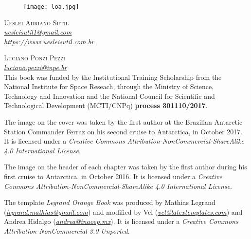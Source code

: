 \newpage
\thispagestyle{empty}

\begin{figure}[H]
    \centering
    \vspace*{\fill}
    \texttt{[image: loa.jpg]}
    \vspace{0.5cm}
\end{figure}

\noindent \textsc{Ueslei Adriano Sutil} 
\\
\noindent \textcolor{bleu_cite}{\href{mailto:uesleisutil1@gmail.com}{\textit{uesleisutil1@gmail.com}}}
\\  %
\noindent \textcolor{bleu_cite}{\href{https://www.uesleisutil.com.br}{\textit{https://www.uesleisutil.com.br}}}
\bigskip

\noindent \textsc{Luciano Ponzi Pezzi}
\\
\noindent \textcolor{bleu_cite}{\href{mailto:luciano.pezzi@inpe.br}{\textit{luciano.pezzi@inpe.br}}}  %
\bigskip
\\

\noindent This book was funded by the Institutional Training Scholarship from the National Institute for Space Reseach, through the Ministry of Science, Technology and Innovation and the National 
Council for Scientific and Technological Development (MCTI/CNPq) \textbf{process 301110/2017}.
\bigskip

\noindent The image on the cover was taken by the first author at the Brazilian Antarctic Station Commander Ferraz on his second cruise to Antarctica,
          in October 2017. It is licensed under a \textit{Creative Commons Attribution-NonCommercial-ShareAlike 4.0 International License}. 
\bigskip

\noindent The image on the header of each chapter was taken by the first author during his first cruise to Antarctica, in October 2016. 
          It is licensed under a \textit{Creative Commons Attribution-NonCommercial-ShareAlike 4.0 International License}. 
\bigskip

\noindent The template \textit{Legrand Orange Book} was produced by Mathias Legrand (\textcolor{bleu_cite}{\href{mailto:legrand.mathias@gmail.com}{\textit{legrand.mathias@gmail.com}}}) 
          and modified by Vel (\textcolor{bleu_cite}{\href{mailto:vel@latextemplates.com}{\textit{vel@latextemplates.com}}}) and Andrea Hidalgo (\textcolor{bleu_cite}{\href{mailto:andrea@inaoep.mx}{\textit{andrea@inaoep.mx}}}). 
          It is licensed under a \textit{Creative Commons Attribution-NonCommercial 3.0 Unported}.
\bigskip

